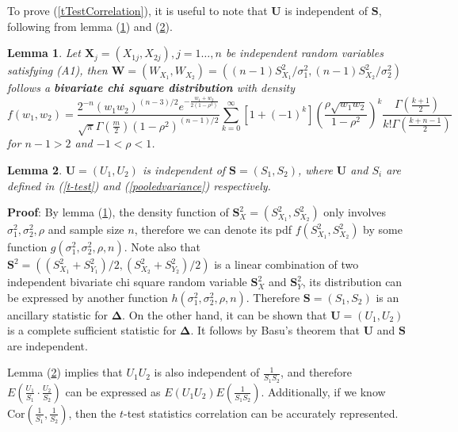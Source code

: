 \documentclass[11pt, a4paper]{article}
\newtheorem{lemma}{Lemma}
\begin{document}
To prove (\ref{tTestCorrelation}), it is useful to note that $\bm U$ is independent of $\bm S$, following from lemma (\ref{lemmabiChisq}) and (\ref{lemmaIndep}).
\begin{lemma}\label{lemmabiChisq}
	Let $\bm X_j = (X_{1j}, X_{2j}), j=1 \ldots, n$ be independent random variables satisfying (A1), then $\bm W = (W_{X_1},W_{X_2}) =((n-1)S_{X_1}^2/{\sigma_1^2}, (n-1)S_{X_2}^2/{\sigma_2^2})$  follows a \textbf{bivariate chi square distribution} with density \citep{joarder2009moments} 
	\begin{equation}\label{biChisq}
	f(w_1, w_2) = \frac{2^{-n}(w_1w_2)^{(n-3)/2}e^{-\frac{w_1 + w_2}{2(1-\rho^2)}}}{\sqrt{\pi}\Gamma(\frac{m}{2})(1-\rho^2)^{(n-1)/2}}\sum_{k=0}^{\infty}[1 + (-1)^k]\left(\frac{\rho\sqrt{w_1w_2}}{1-\rho^2}\right)^k\frac{\Gamma(\frac{k+1}{2})}{k!\Gamma(\frac{k + n-1}{2})}
	\end{equation}
	for $n-1>2$ and $-1<\rho < 1$.
\end{lemma}
\begin{lemma}\label{lemmaIndep}
	$\bm U =(U_1, U_2)$ is independent of $\bm S = (S_1 ,S_2)$, where $\bm U$ and $S_i$ are defined in (\ref{t-test})  and (\ref{pooledvariance}) respectively.
\end{lemma}
\textbf{Proof}: By lemma (\ref{lemmabiChisq}), the density function of $\bm S^2_X= (S_{X_1}^2,S_{X_2}^2 )$ only involves $\sigma^2_1, \sigma^2_2, \rho$ and sample size $n$, therefore we can denote its pdf $f(S_{X_1}^2,S_{X_2}^2)$ by some function $g(\sigma^2_1, \sigma^2_2, \rho, n)$. Note also that $\bm S^2 = \left((S_{X_1}^2 +S_{Y_1}^2 )/2, (S_{X_2}^2 + S_{Y_2}^2)/2\right) $ is a linear combination of two independent bivariate chi square random variable $\bm S^2_X$ and $\bm S^2_Y$, its distribution can be expressed by another function $h(\sigma^2_1, \sigma^2_2, \rho, n)$. Therefore $\bm S = (S_1 ,S_2)$ is an ancillary statistic for $\bm \Delta$. On the other hand, it can be shown that $\bm U =(U_1, U_2)$ is a complete sufficient statistic for $\bm \Delta$. It follows by Basu's theorem that $\bm U$ and $\bm S$ are independent. 


Lemma (\ref{lemmaIndep}) implies that  $U_1U_2$ is also independent of $\frac{1}{S_1S_2}$, and therefore $E(\frac{U_1}{S_1} \cdot\frac{U_2}{S_2})$ can be expressed as $E(U_1U_2)E(\frac{1}{S_1S_2})$. Additionally, if we know $\text{Cor}(\frac{1}{S_1}, \frac{1}{S_2})$, then the $t$-test statistics correlation can be accurately represented. 
\end{document}
